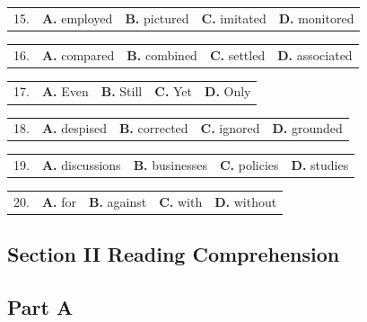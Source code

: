 \documentclass[UTF8,11pt]{ctexart}
\begin{document}
\noindent\begin{tabularx}{\linewidth}{@{}lXXXX@{}}15. & \textbf{A.} employed & \textbf{B.} pictured & \textbf{C.} imitated & \textbf{D.} monitored\\\end{tabularx}\par

\noindent\begin{tabularx}{\linewidth}{@{}lXXXX@{}}16. & \textbf{A.} compared & \textbf{B.} combined & \textbf{C.} settled & \textbf{D.} associated\\\end{tabularx}\par

\noindent\begin{tabularx}{\linewidth}{@{}lXXXX@{}}17. & \textbf{A.} Even & \textbf{B.} Still & \textbf{C.} Yet & \textbf{D.} Only\\\end{tabularx}\par

\noindent\begin{tabularx}{\linewidth}{@{}lXXXX@{}}18. & \textbf{A.} despised & \textbf{B.} corrected & \textbf{C.} ignored & \textbf{D.} grounded\\\end{tabularx}\par

\noindent\begin{tabularx}{\linewidth}{@{}lXXXX@{}}19. & \textbf{A.} discussions & \textbf{B.} businesses & \textbf{C.} policies & \textbf{D.} studies\\\end{tabularx}\par

\noindent\begin{tabularx}{\linewidth}{@{}lXXXX@{}}20. & \textbf{A.} for & \textbf{B.} against & \textbf{C.} with & \textbf{D.} without\\\end{tabularx}\par

\subsection*{\textbf{Section II Reading Comprehension}}


\subsection*{\textbf{Part A}}
\end{document}
